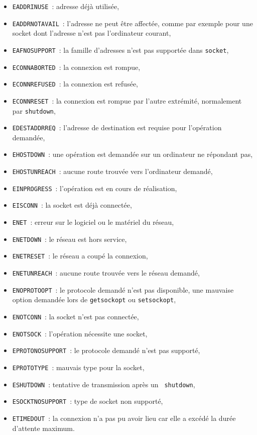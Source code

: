\documentclass [twoside] {report}
\begin{document}
\begin {itemize}
    \item {\tt EADDRINUSE}~: adresse déjà utilisée,
    \item {\tt EADDRNOTAVAIL}~: l'adresse ne peut être affectée, comme
	par exemple pour une socket dont l'adresse n'est
	pas l'ordinateur courant,
    \item {\tt EAFNOSUPPORT}~: la famille d'adresses n'est pas supportée
	dans {\tt socket},
    \item {\tt ECONNABORTED}~: la connexion est rompue,
    \item {\tt ECONNREFUSED}~: la connexion est refusée,
    \item {\tt ECONNRESET}~: la connexion est rompue par l'autre
	extrémité, normalement par {\tt shutdown},
    \item {\tt EDESTADDRREQ}~: l'adresse de destination est requise pour
	l'opération demandée,
    \item {\tt EHOSTDOWN}~: une opération est demandée sur un ordinateur
	ne répondant pas,
    \item {\tt EHOSTUNREACH}~: aucune route trouvée vers l'ordinateur
	demandé,
    \item {\tt EINPROGRESS}~: l'opération est en cours de réalisation,
    \item {\tt EISCONN}~: la socket est déjà connectée,
    \item {\tt ENET}~: erreur sur le logiciel ou le matériel du réseau,
    \item {\tt ENETDOWN}~: le réseau est hors service,
    \item {\tt ENETRESET}~: le réseau a coupé la connexion,
    \item {\tt ENETUNREACH}~: aucune route trouvée vers le réseau
	demandé,
    \item {\tt ENOPROTOOPT}~: le protocole demandé n'est pas
	disponible, une mauvaise option demandée lors de
	{\tt getsockopt} ou {\tt setsockopt},
    \item {\tt ENOTCONN}~: la socket n'est pas connectée,
    \item {\tt ENOTSOCK}~: l'opération nécessite une socket,
    \item {\tt EPROTONOSUPPORT}~: le protocole demandé n'est pas
	supporté,
    \item {\tt EPROTOTYPE}~: mauvais type pour la socket,
    \item {\tt ESHUTDOWN}~: tentative de transmission après un {\tt
	shutdown},
    \item {\tt ESOCKTNOSUPPORT}~: type de socket non supporté,
    \item {\tt ETIMEDOUT}~: la connexion n'a pas pu avoir lieu car elle
	a excédé la durée d'attente maximum.
\end {itemize}
\end{document}
